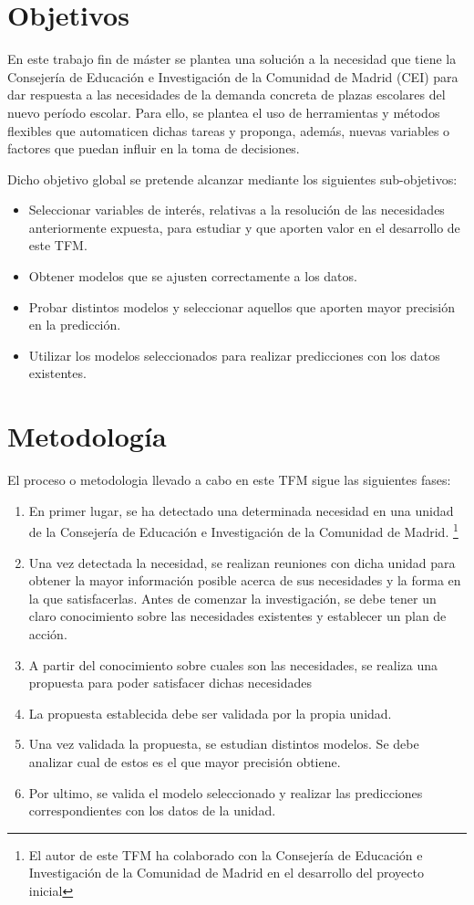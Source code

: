 \section{Objetivos}
En este trabajo fin de máster se plantea una solución a la necesidad que tiene la Consejería de Educación e Investigación de la Comunidad de Madrid (CEI) para dar respuesta a las necesidades de la demanda concreta de plazas escolares del nuevo período escolar. Para ello, se plantea el uso de herramientas y métodos flexibles que automaticen dichas tareas y proponga, además, nuevas variables o factores que puedan influir en la toma de decisiones. 

Dicho objetivo global se pretende alcanzar mediante los siguientes sub-objetivos:
\begin{itemize}
	\item Seleccionar variables de interés, relativas a la resolución de las necesidades anteriormente expuesta, para estudiar y que aporten valor en el desarrollo de este TFM.
	\item Obtener modelos que se ajusten correctamente a los datos.
	\item Probar distintos modelos y seleccionar aquellos que aporten mayor precisión en la predicción. 
	\item Utilizar los modelos seleccionados para realizar predicciones con los datos existentes. 
\end{itemize}

\section{Metodología}
El proceso o metodologia llevado a cabo en este TFM sigue las siguientes fases:
\begin{enumerate}
	\item En primer lugar, se ha detectado una determinada necesidad en una unidad de la Consejería de Educación e Investigación de la Comunidad de Madrid. \footnote{El autor de este TFM ha colaborado con la Consejería de Educación e Investigación de la Comunidad de Madrid en el desarrollo del proyecto inicial} 
	\item Una vez detectada la necesidad, se realizan reuniones con dicha unidad para obtener la mayor información posible acerca de sus necesidades y la forma en la que satisfacerlas. Antes de comenzar la investigación, se debe tener un claro conocimiento sobre las necesidades existentes y establecer un plan de acción.
	\item A partir del conocimiento sobre cuales son las necesidades, se realiza una propuesta para poder satisfacer dichas necesidades
	\item La propuesta establecida debe ser validada por la propia unidad.
	\item Una vez validada la propuesta, se estudian distintos modelos. Se debe analizar cual de estos es el que mayor precisión obtiene.
	\item Por ultimo, se valida el modelo seleccionado y realizar las predicciones correspondientes con los datos de la unidad.
\end{enumerate}

